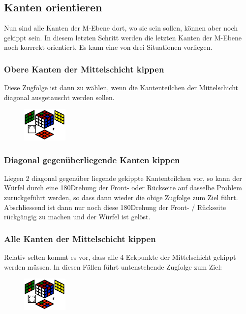 \documentclass[letterpaper,10pt,twoside,twocolumn,openany]{book}
\begin{document}
\newpage
\subsection{Kanten orientieren}
\begin{justify}
Nun sind alle Kanten der M-Ebene dort, wo sie sein sollen, können aber noch gekippt sein. In diesem letzten Schritt werden die letzten Kanten der M-Ebene noch korrrekt orientiert. Es kann eine von drei Situationen vorliegen.
\end{justify}

\subsubsection{Obere Kanten der Mittelschicht kippen}
\begin{justify}
Diese Zugfolge ist dann zu wählen, wenn die Kantenteilchen der Mittelschicht diagonal ausgetauscht werden sollen.
\end{justify}
\begin{figure}[!htb] 
  \centering
     \includegraphics[width=0.20\textwidth]{img/middle-topswap.png}
\end{figure}

\subsubsection{Diagonal gegenüberliegende Kanten kippen}
\begin{justify}
Liegen 2 diagonal gegenüber liegende gekippte Kantenteilchen vor, so kann der Würfel durch eine 180\degree Drehung der Front- oder Rückseite auf dasselbe Problem zurückgeführt werden, so dass dann wieder die obige Zugfolge zum Ziel führt. Abschliessend ist dann nur noch diese 180\degree Drehung der Front- / Rückseite rückgängig zu machen und der Würfel ist gelöst.
\end{justify}

\subsubsection{Alle Kanten der Mittelschicht \newline kippen}
\begin{justify}
Relativ selten kommt es vor, dass alle 4 Eckpunkte der Mittelschicht gekippt werden müssen. In diesen Fällen führt untenstehende Zugfolge zum Ziel:
\end{justify}
\begin{figure}[!htb] 
  \centering
     \includegraphics[width=0.20\textwidth]{img/middle-allswap.png}
\end{figure}
            

\end{document}

